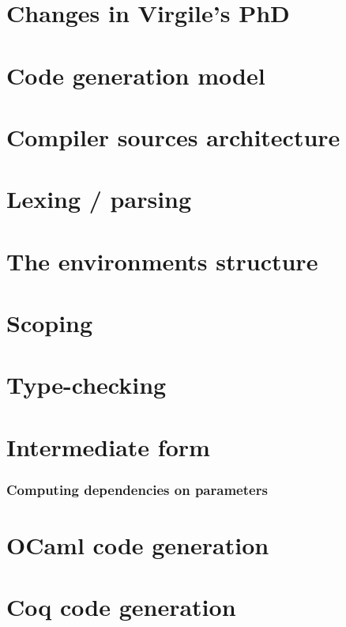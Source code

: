 \documentclass{book}
\begin{document}
\setcounter{tocdepth}{1}
\tableofcontents


\chapter{Changes in Virgile's PhD}


\chapter{Code generation model}


\chapter{Compiler sources architecture}


\chapter{Lexing / parsing}


\chapter{The environments structure}


\chapter{Scoping}


\chapter{Type-checking}


\chapter{Intermediate form}
\subsection{Computing dependencies on parameters}

\chapter{OCaml code generation}

\chapter{Coq code generation}
\end{document}
